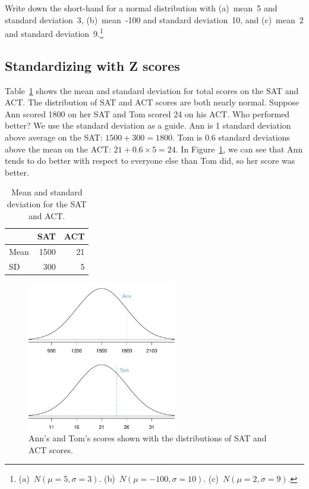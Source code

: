 \begin{exercise}
Write down the short-hand for a normal distribution with (a)~mean~5 and standard deviation~3, (b)~mean~-100 and standard deviation~10, and (c)~mean~2 and standard deviation~9.\footnote{(a)~$N(\mu=5,\sigma=3)$. (b)~$N(\mu=-100, \sigma=10)$. (c)~$N(\mu=2, \sigma=9)$.}
\end{exercise}

\subsection{Standardizing with Z scores}

\begin{example}{Table~\ref{satACTstats} shows the mean and standard deviation for total scores on the SAT and ACT. The distribution of SAT and ACT scores are both nearly normal. Suppose Ann scored 1800 on her SAT and Tom scored 24 on his ACT. Who performed better?}\label{actSAT}
We use the standard deviation as a guide. Ann is 1 standard deviation above average on the SAT: $1500 + 300=1800$. Tom is 0.6 standard deviations above the mean on the ACT: $21+0.6\times 5=24$. In Figure~\ref{satActNormals}, we can see that Ann tends to do better with respect to everyone else than Tom did, so her score was better.
\end{example}

\begin{table}[ht]
\centering
\begin{tabular}{l r r}
  \hline
  & SAT & ACT \\
  \hline
Mean \hspace{0.3cm} & 1500 & 21 \\
SD & 300 & 5 \\
   \hline
\end{tabular}
\caption{Mean and standard deviation for the SAT and ACT.}
\label{satACTstats}
\end{table}

\begin{figure}[ht]
\centering
\includegraphics[width=65mm]{02/figures/satActNormals/satActNormals}
\caption{Ann's and Tom's scores shown with the distributions of SAT and ACT scores.}
\label{satActNormals}
\end{figure}

